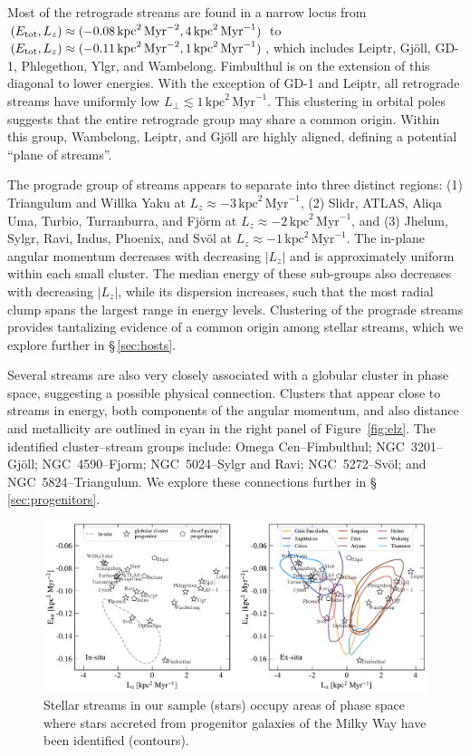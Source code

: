\documentclass[twocolumn]{aastex63}
\newcommand{\ul}{\ensuremath{\textrm{kpc}^2\,\textrm{Myr}^{-1}}}
\newcommand{\ue}{\ensuremath{\textrm{kpc}^2\,\textrm{Myr}^{-2}}}
\begin{document}
Most of the retrograde streams are found in a narrow locus from $(E_{\rm tot}, L_z)\approx(-0.08\,\ue,\allowbreak 4\,\ul)$ to $(E_{\rm tot}, L_z)\approx(-0.11\,\ue,\allowbreak 1\,\ul)$, which includes Leiptr, Gj\" oll, GD-1, Phlegethon, Ylgr, and Wambelong.
Fimbulthul is on the extension of this diagonal to lower energies.
With the exception of GD-1 and Leiptr, all retrograde streams have uniformly low $L_\perp\lesssim1\,\ul$.
This clustering in orbital poles suggests that the entire retrograde group may share a common origin.
Within this group, Wambelong, Leiptr, and Gj\" oll are highly aligned, defining a potential ``plane of streams''.

The prograde group of streams appears to separate into three distinct regions: (1) Triangulum and Willka Yaku at $L_z\approx-3\,\ul$, (2) Slidr, ATLAS, Aliqa Uma, Turbio, Turranburra, and Fj\" orm at $L_z\approx-2\,\ul$, and (3) Jhelum, Sylgr, Ravi, Indus, Phoenix, and Sv\" ol at $L_z\approx-1\,\ul$.
The in-plane angular momentum decreases with decreasing $|L_z|$ and is approximately uniform within each small cluster.
The median energy of these sub-groups also decreases with decreasing $|L_z|$, while its dispersion increases, such that the most radial clump spans the largest range in energy levels.
Clustering of the prograde streams  provides tantalizing evidence of a common origin among stellar streams, which we explore further in \S\,\ref{sec:hosts}.

Several streams are also very closely associated with a globular cluster in phase space, suggesting a possible physical connection.
Clusters that appear close to streams in energy, both components of the angular momentum, and also distance and metallicity are outlined in cyan in the right panel of Figure~\ref{fig:elz}.
The identified cluster--stream groups include: Omega Cen--Fimbulthul; NGC~3201--Gj\" oll; NGC~4590--Fjorm; NGC~5024--Sylgr and Ravi; NGC~5272--Sv\" ol; and NGC~5824--Triangulum.
We explore these connections further in \S\,\ref{sec:progenitors}.

\begin{figure}
\begin{center}
\includegraphics[width=\textwidth]{stream_hosts.pdf}
\end{center}
\caption{
Stellar streams in our sample (stars) occupy areas of phase space where stars accreted from progenitor galaxies of the Milky Way have been identified (contours).
}
\label{fig:hosts}
\end{figure}
\end{document}
